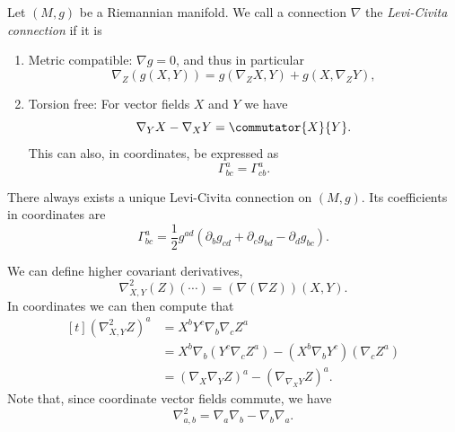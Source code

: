 \documentclass[titlepage,numbers=noenddot,headinclude,oneside,%
footinclude=true,cleardoublepage=empty,%
BCOR=5mm,paper=a4,fontsize=11pt,%
english,%
]{scrartcl}
\begin{document}
\begin{theorem}
    Let \( (M,g) \) be a Riemannian manifold. We call a connection \( \nabla \) the \emph{Levi-Civita connection} if it is
    \begin{enumerate}
        \item Metric compatible: \( \nabla g=0 \), and thus in particular
        \begin{equation*}
            \nabla_Z (g(X,Y))=g(\nabla_Z X, Y)+g(X,\nabla_Z Y),
        \end{equation*}
        \item Torsion free: For vector fields \( X \) and \( Y \) we have
        \begin{equation*}
            \nabla_Y X-\nabla_X Y=\commutator{X}{Y}.
        \end{equation*}
        This can also, in coordinates, be expressed as
        \begin{equation*}
            \Gamma^{a}_{bc} = \Gamma^a_{cb}.
        \end{equation*}
    \end{enumerate}
    There always exists a unique Levi-Civita connection on \( (M,g) \). Its coefficients in coordinates are
    \begin{equation*}
        \Gamma^a_{bc}=\frac{1}{2}g^{ad}(\partial_b g_{cd}+\partial_c g_{bd}-\partial_d g_{bc}).
    \end{equation*}
\end{theorem}
\begin{remark}
    We can define higher covariant derivatives, \eg
    \begin{equation*}
        \nabla^2_{X,Y}(Z)(\cdots)=(\nabla(\nabla Z))(X,Y).
    \end{equation*}
    In coordinates we can then compute that
    \begin{equation*}
        \begin{aligned}[t]
            (\nabla^2_{X,Y}Z)^a&=X^b Y^c \nabla_b\nabla_c Z^a\\
            &=X^b \nabla_b (Y^c \nabla_c Z^a)-(X^b \nabla_b Y^c)(\nabla_c Z^a)\\
            &=(\nabla_X \nabla_Y Z)^a-(\nabla_{\nabla_X Y}Z)^a.
        \end{aligned}
    \end{equation*}
    Note that, since coordinate vector fields commute, we have
    \begin{equation*}
        \nabla^2_{a,b}=\nabla_a \nabla_b-\nabla_b \nabla_a.
    \end{equation*}
\end{remark}
\end{document}
